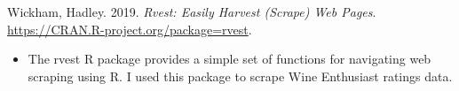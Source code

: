 \begin{itemize}
\begin{itemize}
\end{itemize}

\hypertarget{ref-wickham2019}{}
Wickham, Hadley. 2019. \emph{Rvest: Easily Harvest (Scrape) Web Pages}.
\url{https://CRAN.R-project.org/package=rvest}.

\begin{itemize}
\tightlist
  \item
    The rvest R package provides a simple set of functions for navigating web scraping using R. I used this package to scrape Wine Enthusiast ratings data.
\end{itemize}


